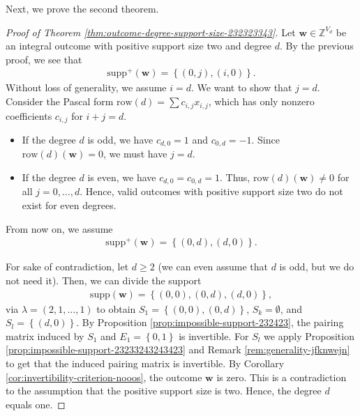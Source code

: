 Next, we prove the second theorem.

\begin{proof}[Proof of Theorem \ref{thm:outcome-degree-support-size-232323343}]
    Let \( \mathbf{w} \in \mathbb{Z}^{V_d} \) be an integral outcome with positive support size two and degree \( d \).
    By the previous proof, we see that 
    \begin{align*}
        \mathrm{supp}^+({\mathbf{w}}) = \left\{  (0,j), (i,0) \right\}.
    \end{align*}
    Without loss of generality, we assume \( i = d \). We want to show that \( j = d \). Consider the Pascal form \( \mathrm{row}(d) = \sum c_{i,j} x_{i,j} \), which has only nonzero coefficients \( c_{i,j} \) for \( i + j = d \).
    
    \begin{itemize}
        \item If the degree \( d \) is odd, we have \( c_{d,0} = 1 \) and \( c_{0,d} = -1 \). Since \( \mathrm{row}(d)(\mathbf{w}) = 0 \), we must have \( j = d \).

        \item If the degree \( d \) is even, we have \( c_{d,0} = c_{0,d} = 1 \). Thus, \( \mathrm{row}(d)(\mathbf w) \neq 0 \) for all \( j = 0, \dots, d \). Hence, valid outcomes with positive support size two do not exist for even degrees.
    \end{itemize}

    From now on, we assume 
    \begin{align*}
        \mathrm{supp}^+({\mathbf{w}}) = \left\{  (0,d), (d,0) \right\}.
    \end{align*}

    For sake of contradiction, let \( d \geq 2 \) (we can even assume that \( d \) is odd, but we do not need it). Then, we can divide the support 
    \begin{align*}
        \mathrm{supp}({\mathbf{w}}) = \left\{  (0,0) , (0,d), (d,0) \right\},
    \end{align*}
    via \( \lambda = (2,1,\dots,1) \) to obtain \( S_1 = \left\{ (0,0), (0,d) \right\} \), \( S_k = \emptyset \), and \( S_l = \left\{ (d,0) \right\} \). By Proposition \ref{prop:impossible-support-232423}, the pairing matrix induced by \( S_1 \) and \( E_1 = \left\{ 0,1 \right\} \) is invertible. For \( S_l \) we apply Proposition \ref{prop:impossible-support-23233243243423} and Remark \ref{rem:generality-jfknwejn} to get that the induced pairing matrix is invertible. By Corollary \ref{cor:invertibility-criterion-nooos}, the outcome \( \mathbf{w} \) is zero. This is a contradiction to the assumption that the positive support size is two. Hence, the degree \( d \) equals one.
\end{proof}